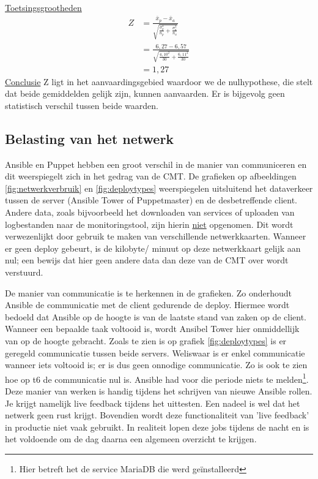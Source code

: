 \underline{Toetsingsgrootheden}
\begin{equation} \label{eq1}
\begin{split}
Z &= \tfrac{\bar x_p - \bar x_a}{\sqrt{\tfrac{\sigma_p^2}{n_p}+\tfrac{\sigma_a^2}{n_a}}}\\
& = \tfrac{ 6,27 - 6,57}{\sqrt{\tfrac{ 4,10 ^2}{30}+\tfrac{ 6,11^2}{30}}} \\
& = 1,27
\end{split}
\end{equation}
\underline{Conclusie}\newline
Z ligt in het aanvaardingsgebied waardoor we de nulhypothese, die stelt dat beide gemiddelden gelijk zijn, kunnen aanvaarden. Er is bijgevolg geen statistisch verschil tussen beide waarden.

\subsection{Belasting van het netwerk}

Ansible en Puppet hebben een groot verschil in de manier van communiceren en dit weerspiegelt zich in het gedrag van de CMT. De grafieken op afbeeldingen \ref{fig:netwerkverbruik} en \ref{fig:deploytypes} weerspiegelen uitsluitend het dataverkeer tussen de server (Ansible Tower of Puppetmaster) en de desbetreffende client. Andere data, zoals bijvoorbeeld het downloaden van services of uploaden van logbestanden naar de monitoringstool, zijn hierin \underline{niet} opgenomen. Dit wordt verwezenlijkt door gebruik te maken van verschillende netwerkkaarten. Wanneer er geen deploy gebeurt, is de kilobyte/ minuut op deze netwerkkaart gelijk aan nul; een bewijs dat hier geen andere data dan deze van de CMT over wordt verstuurd.  \newline

De manier van communicatie is te herkennen in de grafieken. Zo onderhoudt Ansible de communicatie met de client gedurende de deploy. Hiermee wordt bedoeld dat Ansible op de hoogte is van de laatste stand van zaken op de client. Wanneer een bepaalde taak voltooid is, wordt Ansibel Tower hier onmiddellijk van op de hoogte gebracht. Zoals te zien is op grafiek \ref{fig:deploytypes} is er geregeld communicatie tussen beide servers. Weliswaar is er enkel communicatie wanneer iets voltooid is; er is dus geen onnodige communicatie. Zo is ook te zien hoe op t6 de communicatie nul is. Ansible had voor die periode niets te melden\footnote{Hier betreft het de service MariaDB die werd ge\"installeerd}. \newline
 Deze manier van werken is handig tijdens het schrijven van nieuwe Ansible rollen. Je krijgt namelijk live feedback tijdens het uittesten. Een nadeel is wel dat het netwerk geen rust krijgt. Bovendien wordt deze functionaliteit van 'live feedback' in productie niet vaak gebruikt. In realiteit lopen deze jobs tijdens de nacht en is het voldoende om de dag daarna een algemeen overzicht te krijgen.\newline

